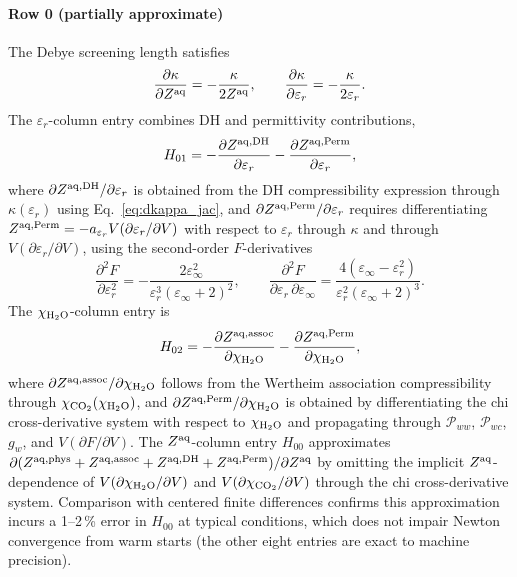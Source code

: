 \documentclass[preprint,12pt,number]{elsarticle}
\begin{document}
\paragraph{Row 0 (partially approximate)}
The Debye screening length satisfies
\begin{equation}
  \frac{\partial\kappa}{\partial Z^{\rm aq}} = -\frac{\kappa}{2Z^{\rm aq}}, \qquad
  \frac{\partial\kappa}{\partial\varepsilon_r} = -\frac{\kappa}{2\varepsilon_r}.
  \label{eq:dkappa_jac}
\end{equation}
The $\varepsilon_r$-column entry combines DH and permittivity contributions,
\begin{equation}
  H_{01} = -\frac{\partial Z^{{\rm aq},\text{DH}}}{\partial\varepsilon_r}
           - \frac{\partial Z^{{\rm aq},\text{Perm}}}{\partial\varepsilon_r},
  \label{eq:H01}
\end{equation}
where $\partial Z^{{\rm aq},\text{DH}}/\partial\varepsilon_r$ is obtained from the
DH compressibility expression \citep{Coelho2025} through $\kappa(\varepsilon_r)$
using Eq.~\eqref{eq:dkappa_jac}, and $\partial Z^{{\rm aq},\text{Perm}}/\partial\varepsilon_r$
requires differentiating $Z^{{\rm aq},\text{Perm}} = -a_{\varepsilon_r}V(\partial\varepsilon_r/\partial V)$
with respect to $\varepsilon_r$ through $\kappa$ and through $V(\partial\varepsilon_r/\partial V)$,
using the second-order $F$-derivatives
\begin{equation}
  \frac{\partial^2 F}{\partial\varepsilon_r^2}
    = -\frac{2\varepsilon_\infty^2}{\varepsilon_r^3(\varepsilon_\infty+2)^2}, \qquad
  \frac{\partial^2 F}{\partial\varepsilon_r\,\partial\varepsilon_\infty}
    = \frac{4(\varepsilon_\infty - \varepsilon_r^2)}{\varepsilon_r^2(\varepsilon_\infty+2)^3}.
  \label{eq:d2F_jac}
\end{equation}
The $\chi_{\rm H_2O}$-column entry is
\begin{equation}
  H_{02} = -\frac{\partial Z^{{\rm aq},\text{assoc}}}{\partial\chi_{\rm H_2O}}
           - \frac{\partial Z^{{\rm aq},\text{Perm}}}{\partial\chi_{\rm H_2O}},
  \label{eq:H02}
\end{equation}
where $\partial Z^{{\rm aq},\text{assoc}}/\partial\chi_{\rm H_2O}$ follows from the
Wertheim association compressibility \citep{Coelho2025} through $\chi_{\rm CO_2}(\chi_{\rm H_2O})$, and
$\partial Z^{{\rm aq},\text{Perm}}/\partial\chi_{\rm H_2O}$ is obtained by differentiating
the chi cross-derivative system with respect to $\chi_{\rm H_2O}$ and propagating
through $\mathcal{P}_{ww}$, $\mathcal{P}_{wc}$, $g_w$, and $V(\partial F/\partial V)$.
The $Z^{\rm aq}$-column entry $H_{00}$ approximates
$\partial(Z^{{\rm aq},\text{phys}}+Z^{{\rm aq},\text{assoc}}+Z^{{\rm aq},\text{DH}}+Z^{{\rm aq},\text{Perm}})/\partial Z^{\rm aq}$
by omitting the implicit $Z^{\rm aq}$-dependence of $V(\partial\chi_{\rm H_2O}/\partial V)$ and
$V(\partial\chi_{\rm CO_2}/\partial V)$ through the chi cross-derivative system.
Comparison with centered finite differences confirms this approximation
incurs a 1--2\,\% error in $H_{00}$ at typical conditions, which does not
impair Newton convergence from warm starts (the other eight entries are exact
to machine precision).
\end{document}
